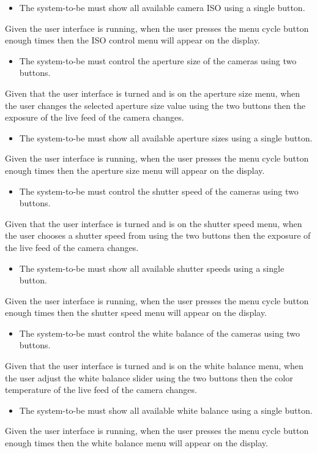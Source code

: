\begin{itemize}
	\item The system-to-be must show all available camera ISO using a single button.
\end{itemize}
Given the user interface is running, when the user presses the menu cycle button enough times then the ISO control menu will appear on the display.
\begin{itemize}
	\item The system-to-be must control the aperture size of the cameras using two buttons.
\end{itemize}
Given that the user interface is turned and is on the aperture size menu, when the user changes the selected aperture size value using the two buttons then the exposure of the live feed of the camera changes.
\begin{itemize}
	\item The system-to-be must show all available aperture sizes using a single button.
\end{itemize}
Given the user interface is running, when the user presses the menu cycle button enough times then the aperture size menu will appear on the display.
\begin{itemize}
	\item The system-to-be must control the shutter speed of the cameras using two buttons.
\end{itemize}
Given that the user interface is turned and is on the shutter speed menu, when the user chooses a shutter speed from using the two buttons then the exposure of the live feed of the camera changes.
\begin{itemize}
	\item The system-to-be must show all available shutter speeds using a single button.
\end{itemize}
Given the user interface is running, when the user presses the menu cycle button enough times then the shutter speed menu will appear on the display.
\begin{itemize}
	\item The system-to-be must control the white balance of the cameras using two buttons.
\end{itemize}
Given that the user interface is turned and is on the white balance menu, when the user adjust the white balance slider using the two buttons then the color temperature of the live feed of the camera changes.
\begin{itemize}
	\item The system-to-be must show all available white balance using a single button.
\end{itemize}
Given the user interface is running, when the user presses the menu cycle button enough times then the white balance menu will appear on the display.
